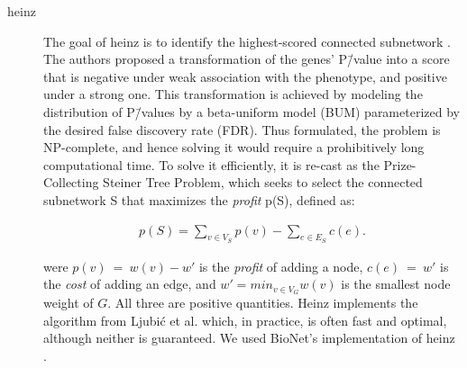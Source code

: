 \documentclass[10pt,letterpaper]{article}
\begin{document}
\begin{description}
\item[{heinz}] The goal of heinz is to identify the highest-scored connected subnetwork \cite{dittrich_identifying_2008}. The authors proposed a transformation of the genes' P\=/value into a score that is negative under weak association with the phenotype, and positive under a strong one. This transformation is achieved by modeling the distribution of P\=/values by a beta-uniform model (BUM) parameterized by the desired false discovery rate (FDR). Thus formulated, the problem is NP-complete, and hence solving it would require a prohibitively long computational time. To solve it efficiently, it is re-cast as the Prize-Collecting Steiner Tree Problem, which seeks to select the connected subnetwork S that maximizes the \emph{profit} p(S), defined as:

\begin{eqnarray}
p(S) = \sum_{v \in V_S} p(v) - \sum_{e \in E_S} c(e). 
\end{eqnarray}

were $p(v)~=~w(v) - w'$ is the \emph{profit} of adding a node, $c(e)~=~w'$ is the \emph{cost} of adding an edge, and $w' = min_{v \in V_{G}} w(v)$ is the smallest node weight of $G$. All three are positive quantities. Heinz implements the algorithm from Ljubić et al. \cite{ljubic_algorithmic_2006} which, in practice, is often fast and optimal, although neither is guaranteed. We used BioNet's implementation of heinz \cite{beisser_bionet:_2010,heinz}.


\end{description}
\end{document}
